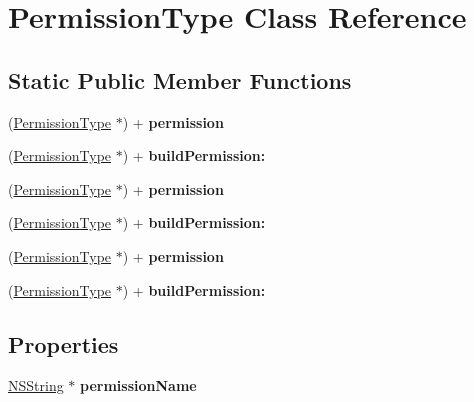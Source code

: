 \hypertarget{interface_permission_type}{
\section{PermissionType Class Reference}
\label{interface_permission_type}
}
\subsection*{Static Public Member Functions}
\begin{DoxyCompactItemize}
\item 
\hypertarget{interface_permission_type_a1c2d97744abedb3b779bb22b00f0b923}{
(\hyperlink{interface_permission_type}{PermissionType} $\ast$) + {\bfseries permission}}
\label{interface_permission_type_a1c2d97744abedb3b779bb22b00f0b923}

\item 
\hypertarget{interface_permission_type_a14047a0df699f9a960acd81b14f7239c}{
(\hyperlink{interface_permission_type}{PermissionType} $\ast$) + {\bfseries buildPermission:}}
\label{interface_permission_type_a14047a0df699f9a960acd81b14f7239c}

\item 
\hypertarget{interface_permission_type_a1c2d97744abedb3b779bb22b00f0b923}{
(\hyperlink{interface_permission_type}{PermissionType} $\ast$) + {\bfseries permission}}
\label{interface_permission_type_a1c2d97744abedb3b779bb22b00f0b923}

\item 
\hypertarget{interface_permission_type_a14047a0df699f9a960acd81b14f7239c}{
(\hyperlink{interface_permission_type}{PermissionType} $\ast$) + {\bfseries buildPermission:}}
\label{interface_permission_type_a14047a0df699f9a960acd81b14f7239c}

\item 
\hypertarget{interface_permission_type_a1c2d97744abedb3b779bb22b00f0b923}{
(\hyperlink{interface_permission_type}{PermissionType} $\ast$) + {\bfseries permission}}
\label{interface_permission_type_a1c2d97744abedb3b779bb22b00f0b923}

\item 
\hypertarget{interface_permission_type_a14047a0df699f9a960acd81b14f7239c}{
(\hyperlink{interface_permission_type}{PermissionType} $\ast$) + {\bfseries buildPermission:}}
\label{interface_permission_type_a14047a0df699f9a960acd81b14f7239c}

\end{DoxyCompactItemize}
\subsection*{Properties}
\begin{DoxyCompactItemize}
\item 
\hypertarget{interface_permission_type_a42e9e131afdbf2a09be5d312c3d7fae9}{
\hyperlink{class_n_s_string}{NSString} $\ast$ {\bfseries permissionName}}
\label{interface_permission_type_a42e9e131afdbf2a09be5d312c3d7fae9}

\end{DoxyCompactItemize}


